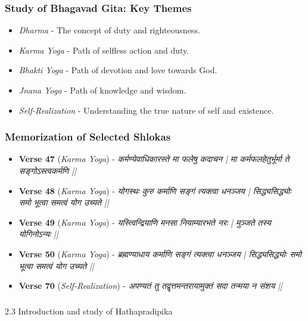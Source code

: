 \begin{frame}[fragile]\frametitle{Study of Bhagavad Gita: Key Themes}

      \begin{itemize}
		\item \textit{Dharma} - The concept of duty and righteousness.
		\item \textit{Karma Yoga} - Path of selfless action and duty.
		\item \textit{Bhakti Yoga} - Path of devotion and love towards God.
		\item \textit{Jnana Yoga} - Path of knowledge and wisdom.
		\item \textit{Self-Realization} - Understanding the true nature of self and existence.
	  \end{itemize}

\end{frame}

\begin{frame}[fragile]\frametitle{Memorization of Selected Shlokas}

      \begin{itemize}
		\item \textbf{Verse 47} (\textit{Karma Yoga}) - \textit{कर्मण्येवाधिकारस्ते मा फलेषु कदाचन | मा कर्मफलहेतुर्भूर्मा ते सङ्गोऽस्त्वकर्मणि ||}
		\item \textbf{Verse 48} (\textit{Karma Yoga}) - \textit{योगस्थः कुरु कर्माणि सङ्गं त्यक्त्वा धनञ्जय | सिद्ध्यसिद्ध्योः समो भूत्वा समत्वं योग उच्यते ||}
		\item \textbf{Verse 49} (\textit{Karma Yoga}) - \textit{यस्त्विन्द्रियाणि मनसा नियाम्यारभते नरः | मुञ्जते तस्य योगिनोऽन्यः ||}
		\item \textbf{Verse 50} (\textit{Karma Yoga}) - \textit{ब्रह्मण्याधाय कर्माणि सङ्गं त्यक्त्वा धनञ्जय | सिद्ध्यसिद्ध्योः समो भूत्वा समत्वं योग उच्यते ||}
		\item \textbf{Verse 70} (\textit{Self-Realization}) - \textit{अपण्यतं तु तद्वृत्तमन्तरायामुक्तं सदा तन्मया न संशय ||}
	  \end{itemize}

\end{frame}

\begin{frame}[fragile]\frametitle{}
\begin{center}
{\Large 2.3 Introduction and study of Hathapradipika}
\end{center}
\end{frame}

